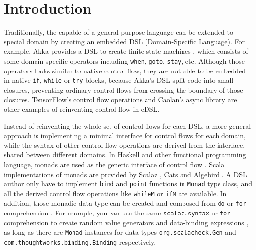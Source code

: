 \section{Introduction}\label{Introduction}

Traditionally, the capable of a general purpose language can be extended to special domain by creating an embedded DSL (Domain-Specific Language). For example, Akka provides a DSL to create finite-state machines \cite{lightbend2017akka}, which consists of some domain-specific operators including \lstinline{when}, \lstinline{goto}, \lstinline{stay}, etc. Although those operators looks similar to native control flow, they are not able to be embedded in native \lstinline{if}, \lstinline{while} or \lstinline{try} blocks, because Akka's DSL split code into small closures, preventing ordinary control flows from crossing the boundary of those closures. TensorFlow's control flow operations \cite{abadi2016tensorflow} and Caolan's async library \cite{caolan2017async} are other examples of reinventing control flow in eDSL.

Instead of reinventing the whole set of control flows for each DSL, a more general approach is implementing a minimal interface for control flows for each domain, while the syntax of other control flow operations are derived from the interface, shared between different domains. In Haskell and other functional programming language, monads are used as the generic interface of control flow \cite{wadler1990comprehending,wadler1992essence,jones1993composing}. Scala implementations of monads are provided by Scalaz \cite{kenji2017scalaz}, Cats \cite{typelevel2017cats} and Algebird \cite{twitter2016algebird}. A DSL author only have to implement \lstinline{bind} and \lstinline{point} functions in \lstinline{Monad} type class, and all the derived control flow operations like \lstinline{whileM} or \lstinline{ifM} are available. In addition, those monadic data type can be created and composed from \lstinline{do} or \lstinline{for} comprehension \cite{jones1998haskell,odersky2004scala}. For example, you can use the same \lstinline{scalaz.syntax} or \lstinline{for} comprehension to create random value generators \cite{nilsson2015scalacheck} and data-binding expressions \cite{yangbo2016binding}, as long as there are \lstinline{Monad} instances for data types \lstinline{org.scalacheck.Gen} and \lstinline{com.thoughtworks.binding.Binding} respectively.

